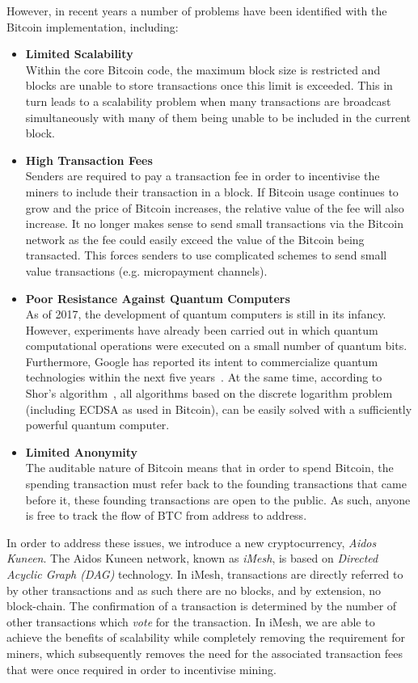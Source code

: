 \documentclass[a4paper,10pt,twocolumn]{article}
\begin{document}
	However, in recent years a number of problems have been identified with the Bitcoin implementation, including:
	\vspace{-0.5\baselineskip}
	\begin{itemize}
		\setlength\itemsep{0em}
		\item\textbf{Limited Scalability}\mbox{}\\ 
		Within the core Bitcoin code, the maximum block size is restricted and blocks are unable to store transactions once this limit 
		is exceeded. This in turn leads to a scalability problem when many transactions are broadcast simultaneously with many of them 
		being unable to be included in the current block.
		\item\textbf{High Transaction Fees}\mbox{}\\ 
		Senders are required to pay a transaction fee in order to incentivise the miners to include their transaction in a block.
		If Bitcoin usage continues to grow and the price of Bitcoin increases, the relative value of the fee will also increase.
		It no longer makes sense to send small transactions via the Bitcoin network
		as the fee could easily exceed the value of the Bitcoin being transacted. This forces senders to use complicated schemes to send small value transactions (e.g. 
		micropayment channels).
		\item\textbf{Poor Resistance Against Quantum Computers}\\ 
		As of 2017, the development of quantum computers is still in its infancy. However, experiments have already been carried out in 
		which quantum computational operations were executed on a small number of quantum bits. Furthermore, Google has reported its 
		intent to commercialize quantum technologies within the next five years~\cite{google}. At the same time, according to Shor's 
		algorithm~\cite{shor}, all algorithms based on the discrete logarithm problem (including ECDSA as used in 
		Bitcoin), can be easily solved with a sufficiently powerful quantum computer. 
		\item\textbf{Limited Anonymity}\mbox{}\\ 
		The auditable nature of Bitcoin means that in order to spend Bitcoin, the spending transaction must refer back to the founding
		transactions that came before it, these founding transactions are open to the public. As such, anyone is free to track the flow
		of BTC from address to address.
	\end{itemize}
	
	In order to address these issues, we introduce a new cryptocurrency, \emph{Aidos Kuneen}.
	The Aidos Kuneen network, known as \emph{iMesh}, is based on \emph{Directed Acyclic Graph (DAG)} technology.
	In iMesh, transactions are directly referred to by other transactions and as such there are no blocks, and by extension, no block-chain.
	The confirmation of a transaction is determined by the number of other transactions which \emph{vote} for the transaction. In iMesh, we are able to achieve the benefits of scalability while completely removing the requirement for miners, which subsequently removes the need for the associated transaction fees that were once required in order to incentivise mining.
	
\end{document}
